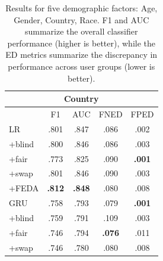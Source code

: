 \begin{table}[tb!]
\begin{tabular}{l||cc|cc}
\multicolumn{5}{c}{\bf Country} \\\hline
&F1&AUC&FNED&FPED\\\hline\hline
LR& .801 & .847 & .086 & .002\\
+blind& .800 & .846 & .086 & .003\\
+fair& .773 & .825 & .090 & \bf .001\\
+swap& .801 & .846 & .090 & .003\\
+FEDA& \bf .812 & \bf .848 & .080 & .008\\
\hline
GRU & .758 & .793 & .079 & \bf .001 \\
+blind& .759 & .791 & .109 & .003\\
+fair& .746 & .794 & \bf .076 & .011\\
+swap& .746 & .780 & .080 & .008 \\\hline
\end{tabular}
\caption{Results for five demographic factors: Age, Gender, Country, Race. F1 and AUC summarize the overall classifier performance (higher is better), while the ED metrics summarize the discrepancy in performance across user groups (lower is better). 
}
\label{chap5:tab:da_all}
\end{table}

